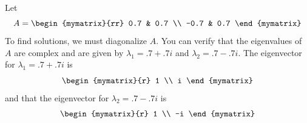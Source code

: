 \begin{solution}
Let
\begin{equation*}
A
=
\begin{mymatrix}{rr}
0.7 & 0.7 \\
-0.7 & 0.7
\end{mymatrix}
\end{equation*}
To find solutions, we must diagonalize $A$. You can verify that the eigenvalues of $A$ are complex and are given by  $\lambda_1 = .7+.7i$ and $\lambda_2 = .7-.7i$. The eigenvector for $\lambda_1 = .7+.7i$ is 
\begin{equation*}
\begin{mymatrix}{r}
1 \\
i
\end{mymatrix} 
\end{equation*}
and that the eigenvector for $\lambda_2 = .7-.7i$ is
\begin{equation*}
\begin{mymatrix}{r}
1 \\
-i
\end{mymatrix}  
\end{equation*}


\end{solution}
